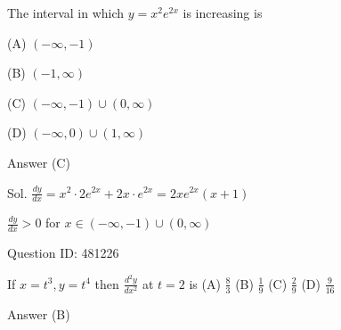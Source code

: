 The interval in which $y=x^{2} e^{2 x}$ is increasing is

(A) $(-\infty,-1)$

(B) $(-1, \infty)$

(C) $(-\infty,-1) \cup(0, \infty)$

(D) $(-\infty, 0) \cup(1, \infty)$

Answer (C)

Sol. $\frac{d y}{d x}=x^{2} \cdot 2 e^{2 x}+2 x \cdot e^{2 x}=2 x e^{2 x}(x+1)$

$\frac{d y}{d x}>0$ for $x \in(-\infty,-1) \cup(0, \infty)$

Question ID: 481226

If $x=t^{3}, y=t^{4}$ then $\frac{d^{2} y}{d x^{2}}$ at $t=2$ is
(A) $\frac{8}{3}$
(B) $\frac{1}{9}$
(C) $\frac{2}{9}$
(D) $\frac{9}{16}$

Answer (B)
